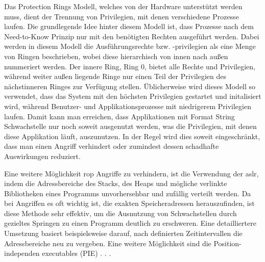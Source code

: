 \documentclass[a4paper,
DIV=13,
12pt,
BCOR=10mm,
department=FakIM,
oneside,
parskip=half,
automark,
listof=totocnumbered,
bibliography=totocnumbered,
acronym=totocnumbered
] {OTHRartcl}
\begin{document}
Das Protection Rings Modell, welches von der Hardware unterstützt werden muss, dient der Trennung von Privilegien, mit denen verschiedene Prozesse laufen.
Die grundlegende Idee hinter diesem Modell ist, dass Prozesse nach dem Need-to-Know Prinzip nur mit den benötigten Rechten ausgeführt werden.
Dabei werden in diesem Modell die Ausführungsrechte bzw. -privilegien
als eine Menge von Ringen beschrieben, wobei diese hierarchisch von innen nach außen nummeriert werden.
Der innere Ring, Ring 0, bietet alle Rechte und Privilegien, während weiter außen liegende Ringe nur einen Teil der Privilegien des nächstinneren Ringes zur Verfügung stellen.
Üblicherweise wird dieses Modell so verwendet, dass das System mit den höchsten Privilegien gestartet und initalisiert wird, während Benutzer- und Applikationsprozesse mit niedrigerem Privilegien
laufen. Damit kann man erreichen, dass Applikationen mit Format String Schwachstelle nur noch soweit ausgenutzt werden, was die Privilegien, mit denen diese Applikation läuft, auszunutzen.
In der Regel wird dies soweit eingeschränkt, dass man einen Angriff verhindert oder zumindest dessen schadhafte Auswirkungen reduziert.

Eine weitere Möglichkeit \ac{rop} Angriffe zu verhindern, ist die Verwendung der \ac{aslr}, indem die Adressbereiche des Stacks, des Heaps und mögliche verlinkte Bibliotheken eines Programms unvorhersehbar und zufällig verteilt werden.
Da bei Angriffen es oft wichtig ist, die exakten Speicheradressen herauszufinden, ist diese Methode sehr effektiv, um die Ausnutzung von Schwachstellen durch gezieltes Springen zu einen Programm deutlich zu erschweren.
Eine detailliertere Umsetzung basiert beispielsweise darauf, nach definierten Zeitintervallen die Adressbereiche neu zu vergeben.
Eine weitere Möglichkeit sind die Position-independen executables (PIE) . . .
\end{document}
